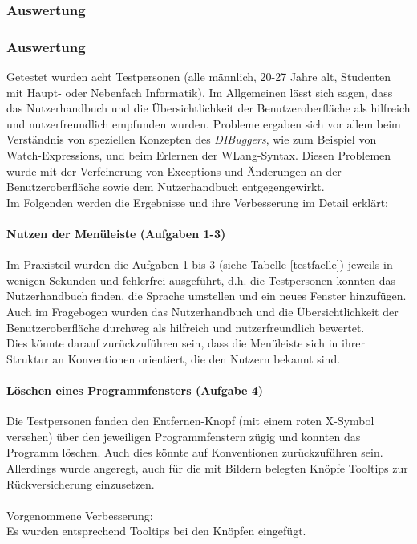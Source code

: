 \documentclass[parskip=full]{scrartcl}
\begin{document}
\subsubsection{Auswertung}

\subsubsection{Auswertung}
Getestet wurden acht Testpersonen (alle männlich, 20-27 Jahre alt, Studenten mit Haupt- oder Nebenfach Informatik).
Im Allgemeinen lässt sich sagen, dass das Nutzerhandbuch und die Übersichtlichkeit der Benutzeroberfläche als hilfreich und nutzerfreundlich empfunden wurden. Probleme ergaben sich vor allem beim Verständnis von speziellen Konzepten des \textit{DIBuggers}, wie zum Beispiel von Watch-Expressions, und beim Erlernen der WLang-Syntax. Diesen Problemen wurde mit der Verfeinerung von Exceptions und Änderungen an der Benutzeroberfläche sowie dem Nutzerhandbuch entgegengewirkt.\\
Im Folgenden werden die Ergebnisse und ihre Verbesserung im Detail erklärt:

\paragraph{Nutzen der Menüleiste (Aufgaben 1-3)}
Im Praxisteil wurden die Aufgaben 1 bis 3 (siehe Tabelle \ref{testfaelle}) jeweils in wenigen Sekunden und fehlerfrei ausgeführt, d.h. die Testpersonen konnten das Nutzerhandbuch finden, die Sprache umstellen und ein neues Fenster hinzufügen.\\
Auch im Fragebogen wurden das Nutzerhandbuch und die Übersichtlichkeit der Benutzeroberfläche durchweg als hilfreich und nutzerfreundlich bewertet.\\
Dies könnte darauf zurückzuführen sein, dass die Menüleiste sich in ihrer Struktur an Konventionen orientiert, die den Nutzern bekannt sind.

\paragraph{Löschen eines Programmfensters (Aufgabe 4)}
Die Testpersonen fanden den Entfernen-Knopf (mit einem roten X-Symbol versehen) über den jeweiligen Programmfenstern zügig und konnten das Programm löschen. Auch dies könnte auf Konventionen zurückzuführen sein. \\Allerdings wurde angeregt, auch für die mit Bildern belegten Knöpfe Tooltips zur Rückversicherung einzusetzen.\\\\
Vorgenommene Verbesserung:\\
Es wurden entsprechend Tooltips bei den Knöpfen eingefügt.
\end{document}
